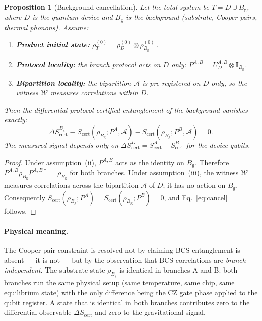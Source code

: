 \documentclass[11pt]{article}
\theoremstyle{plain}
\newtheorem{proposition}{Proposition}[section]
\theoremstyle{definition}
\theoremstyle{remark}
\begin{document}
\begin{proposition}[Background cancellation]
\label{prop:cancel}
Let the total system be $T = D \cup B_{\mathrm{g}}$, where $D$ is the quantum device
and $B_{\mathrm{g}}$ is the background (substrate, Cooper pairs, thermal phonons).
Assume:
\begin{enumerate}[label=(\roman*),noitemsep]
  \item \textbf{Product initial state:}
    $\rho_T^{(0)} = \rho_D^{(0)} \otimes \rho_{B_{\mathrm{g}}}^{(0)}$\,.
  \item \textbf{Protocol locality:} the branch protocol acts on $D$ only:
    $P^{A,B} = U_D^{A,B} \otimes \mathbf{I}_{B_{\mathrm{g}}}$.
  \item \textbf{Bipartition locality:} the bipartition $\mathcal{A}$ is pre-registered
    on $D$ only, so the witness $\mathcal{W}$ measures correlations within $D$.
\end{enumerate}
Then the differential protocol-certified entanglement of the background vanishes exactly:
\begin{equation}
  \Delta S_{\mathrm{cert}}^{B_{\mathrm{g}}}
  \equiv S_{\mathrm{cert}}\!\left(\rho_{B_{\mathrm{g}}}; P^A, \mathcal{A}\right)
       - S_{\mathrm{cert}}\!\left(\rho_{B_{\mathrm{g}}}; P^B, \mathcal{A}\right)
  = 0.
  \label{eq:cancel}
\end{equation}
The measured signal depends only on $\Delta S_{\mathrm{cert}}^D = S_{\mathrm{cert}}^A
- S_{\mathrm{cert}}^B$ for the device qubits.
\end{proposition}

\begin{proof}
Under assumption~(ii), $P^{A,B}$ acts as the identity on $B_{\mathrm{g}}$.
Therefore $P^{A,B}\rho_{B_{\mathrm{g}}}P^{A,B\dagger} = \rho_{B_{\mathrm{g}}}$
for both branches.  Under assumption~(iii), the witness $\mathcal{W}$ measures
correlations across the bipartition $\mathcal{A}$ of $D$; it has no action on
$B_{\mathrm{g}}$.  Consequently
$S_{\mathrm{cert}}(\rho_{B_{\mathrm{g}}}; P^A) = S_{\mathrm{cert}}(\rho_{B_{\mathrm{g}}}; P^B) = 0$,
and Eq.~\eqref{eq:cancel} follows.
\end{proof}

\paragraph{Physical meaning.}
The Cooper-pair constraint is resolved not by claiming BCS entanglement is absent ---
it is not --- but by the observation that BCS correlations are \emph{branch-independent}.
The substrate state $\rho_{B_{\mathrm{g}}}$ is identical in branches A and B: both
branches run the same physical setup (same temperature, same chip, same equilibrium state)
with the only difference being the CZ gate phase applied to the qubit register.  A state
that is identical in both branches contributes zero to the differential observable
$\Delta S_{\mathrm{cert}}$ and zero to the gravitational signal.
\end{document}
